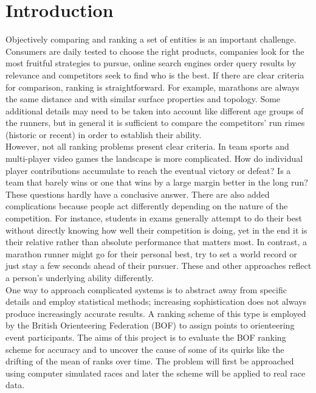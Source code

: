 %
\section{Introduction}
%
Objectively comparing and ranking a set of entities is an important challenge. Consumers are daily tested to choose the right products, companies look for the most fruitful strategies to pursue, online search engines order query results by relevance and competitors seek to find who is the best. If there are clear criteria for comparison, ranking is straightforward. For example, marathons are always the same distance and with similar surface properties and topology. Some additional details may need to be taken into account like different age groups of the runners, but in general it is sufficient to compare the competitors' run rimes (historic or recent) in order to establish their ability.\\ 
However, not all ranking problems present clear criteria. In team sports and multi-player video games the landscape is more complicated. How do individual player contributions accumulate to reach the eventual victory or defeat? Is a team that barely wins or one that wins by a large margin better in the long run? These questions hardly have a conclusive answer. There are also added complications because people act differently depending on the nature of the competition. For instance, students in exams generally attempt to do their best without directly knowing how well their competition is doing, yet in the end it is their relative rather than absolute performance that matters most. In contrast, a marathon runner might go for their personal best, try to set a world record or just stay a few seconds ahead of their pursuer. These and other approaches reflect a person's underlying ability differently.\\
One way to approach complicated systems is to abstract away from specific details and employ statistical methods; increasing sophistication does not always produce increasingly accurate results. A ranking scheme of this type is employed by the British Orienteering Federation (BOF) to assign points to orienteering event participants. The aims of this project is to evaluate the BOF ranking scheme for accuracy and to uncover the cause of some of its quirks like the drifting of the mean of ranks over time. The problem will first be approached using computer simulated races and later the scheme will be applied to real race data.\\